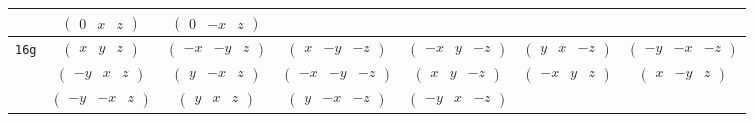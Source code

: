 \documentclass[fleqn,9pt,landscape]{jsarticle}
\begin{document}
\begin{center}
\begin{longtable}{ccccccc}
& $ \begin{pmatrix} 0 & x & z \end{pmatrix} $ & $ \begin{pmatrix} 0 & - x & z \end{pmatrix} $ & $  $ & $  $ & $  $ & $  $ \\ \hline
{\tt 16g} & $ \begin{pmatrix} x & y & z \end{pmatrix} $ & $ \begin{pmatrix} - x & - y & z \end{pmatrix} $ & $ \begin{pmatrix} x & - y & - z \end{pmatrix} $ & $ \begin{pmatrix} - x & y & - z \end{pmatrix} $ & $ \begin{pmatrix} y & x & - z \end{pmatrix} $ & $ \begin{pmatrix} - y & - x & - z \end{pmatrix} $ \\
& $ \begin{pmatrix} - y & x & z \end{pmatrix} $ & $ \begin{pmatrix} y & - x & z \end{pmatrix} $ & $ \begin{pmatrix} - x & - y & - z \end{pmatrix} $ & $ \begin{pmatrix} x & y & - z \end{pmatrix} $ & $ \begin{pmatrix} - x & y & z \end{pmatrix} $ & $ \begin{pmatrix} x & - y & z \end{pmatrix} $ \\
& $ \begin{pmatrix} - y & - x & z \end{pmatrix} $ & $ \begin{pmatrix} y & x & z \end{pmatrix} $ & $ \begin{pmatrix} y & - x & - z \end{pmatrix} $ & $ \begin{pmatrix} - y & x & - z \end{pmatrix} $ & $  $ & $  $ \\
\end{longtable}
\end{center}
\end{document}

